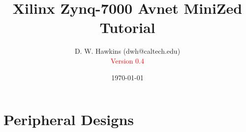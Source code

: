 \documentclass[10pt,twoside]{article}
\begin{document}
\title{Xilinx Zynq-7000 Avnet MiniZed Tutorial}
\author{D. W. Hawkins (dwh@caltech.edu)\\\textcolor{red}{Version 0.4}}
\date{\today}

\maketitle

\tableofcontents

\pagestyle{fancy}

\cleardoublepage

%
%

\clearpage

\clearpage
\clearpage


\clearpage

\clearpage

\clearpage



\clearpage

\clearpage
\section{Peripheral Designs}

\clearpage

\clearpage


\appendix
\clearpage

\clearpage

\clearpage

\clearpage

\clearpage

%
%



\end{document}
